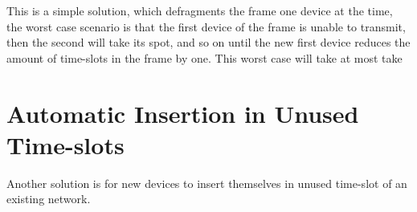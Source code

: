\bigskip

This is a simple solution, which defragments the frame one device at the time, the worst case scenario is that the first device of the frame is unable to transmit, then the second will take its spot, and so on until the new first device reduces the amount of time-slots in the frame by one. 
This worst case will take at most take 

\section{Automatic Insertion in Unused Time-slots}
Another solution is for new devices to insert themselves in unused time-slot of an existing network.
